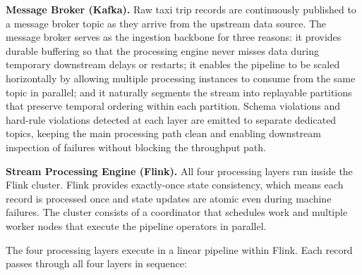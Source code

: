 \bigskip
\noindent\textbf{Message Broker (Kafka).} Raw taxi trip records are continuously published to a message broker topic as they arrive from the upstream data source. The message broker serves as the ingestion backbone for three reasons: it provides durable buffering so that the processing engine never misses data during temporary downstream delays or restarts; it enables the pipeline to be scaled horizontally by allowing multiple processing instances to consume from the same topic in parallel; and it naturally segments the stream into replayable partitions that preserve temporal ordering within each partition. Schema violations and hard-rule violations detected at each layer are emitted to separate dedicated topics, keeping the main processing path clean and enabling downstream inspection of failures without blocking the throughput path.

\bigskip
\noindent\textbf{Stream Processing Engine (Flink).} All four processing layers run inside the Flink cluster. Flink provides exactly-once state consistency, which means each record is processed once and state updates are atomic even during machine failures. The cluster consists of a coordinator that schedules work and multiple worker nodes that execute the pipeline operators in parallel.

The four processing layers execute in a linear pipeline within Flink. Each record passes through all four layers in sequence:

